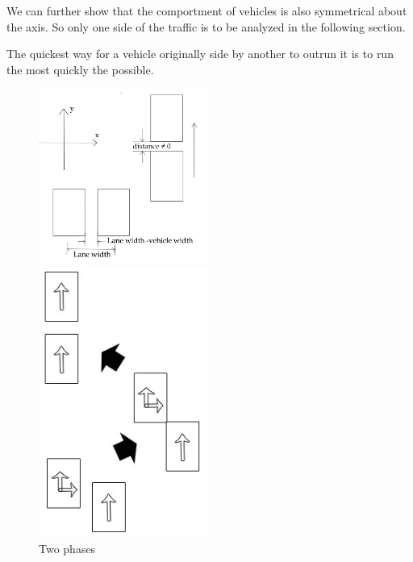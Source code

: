 \documentclass{mcmthesis}
\begin{document}
We can further show that the comportment of vehicles is also symmetrical about the axis. So only one side of the traffic is to be analyzed in the following section.

\begin{Theorem} \label{thm:yingsongsheng2}
The quickest way for a vehicle originally side by another to outrun it is to run the most quickly the possible.
\end{Theorem}

\begin{figure}[H]
	\begin{minipage}[h]{0.5\linewidth}
		\centering
		\includegraphics[width=2.2in]{Attachment-1.jpg}
	\end{minipage}
	\begin{minipage}[h]{0.5\linewidth}
		\centering
		\includegraphics[width=2.2in]{D.jpg}
		\caption{Two phases}
		\label{phase}
	\end{minipage}
\end{figure}
\end{document}
